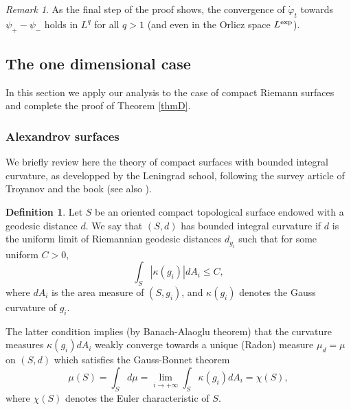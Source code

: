 \documentclass[a4paper,11pt,leqno,english]{smfart}
\theoremstyle{plain}
\theoremstyle{plain}
\numberwithin{equation}{section} %
\numberwithin{figure}{section} %
\theoremstyle{plain}
\theoremstyle{plain}
\theoremstyle{remark}
\theoremstyle{remark}
\newtheorem{rem}[thm]{Remark}
\theoremstyle{definition}
\theoremstyle{plain}
\theoremstyle{plain}
\theoremstyle{definition}
\newtheorem{defi}[thm]{Definition}
\newcommand{\f}{\varphi}
\newcommand{\p}{\psi}
\begin{document}
\begin{rem}
As the final step of the proof shows, the convergence of $\dot{\f}_t$ towards $\p_+-\p_-$ 
holds in $L^q$ for all $q>1$ (and even in the Orlicz space $L^{\rm exp}$).
\end{rem}
 





 

 
\subsection{The one dimensional case} \label{sec:alexandrov}

In this section we apply our analysis to the case of compact Riemann surfaces
and complete the proof of  Theorem \ref{thmD}.


\subsubsection{Alexandrov surfaces}\label{sec-alex-surf}
 



  We briefly review here the theory of compact surfaces with bounded integral curvature,
  as developped by the Leningrad school, following the survey article of
  Troyanov \cite{Troy09} and the book \cite{Re23} (see also \cite{CL25}).
  
  \begin{defi}
  Let $S$ be an oriented compact topological surface endowed with a geodesic distance $d$.
  We say that $(S,d)$ has bounded integral curvature if $d$ is the uniform limit
  of Riemannian geodesic distances $d_{g_i}$ such that for some uniform  $C>0$,
  $$
  \int_{S} |\kappa(g_i)| d A_i \leq C,
  $$
  where  $d A_i$ is the area measure of $(S,g_i)$,
  and $\kappa(g_i)$ denotes the Gauss curvature of $g_i$.
  \end{defi}
  
 The latter condition implies (by Banach-Alaoglu theorem) that the curvature
 measures $\kappa(g_i) dA_i$ weakly converge towards a unique
 (Radon) measure $\mu_d=\mu$ on $(S,d)$ which satisfies the Gauss-Bonnet theorem
 $$
 \mu(S)=\int_S d\mu =\lim_{i \rightarrow +\infty} \int_S \kappa(g_i) dA_i=\chi(S),
 $$
 where $\chi(S)$ denotes the Euler characteristic of $S$. 
 
\end{document}
